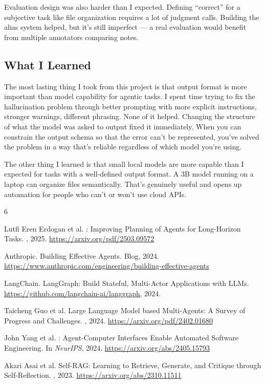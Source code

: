 \documentclass{article}
\begin{document}
Evaluation design was also harder than I expected. Defining ``correct'' for a subjective task like file organization requires a lot of judgment calls. Building the alias system helped, but it's still imperfect — a real evaluation would benefit from multiple annotators comparing notes.

\subsection{What I Learned}

The most lasting thing I took from this project is that output format is more important than model capability for agentic tasks. I spent time trying to fix the hallucination problem through better prompting with more explicit instructions, stronger warnings, different phrasing. None of it helped. Changing the structure of what the model was asked to output fixed it immediately. When you can constrain the output schema so that the error can't be represented, you've solved the problem in a way that's reliable regardless of which model you're using.

The other thing I learned is that small local models are more capable than I expected for tasks with a well-defined output format. A 3B model running on a laptop can organize files semantically. That's genuinely useful and opens up automation for people who can't or won't use cloud APIs.



\begin{thebibliography}{6}

Lutfi Eren Erdogan et al.
: Improving Planning of Agents for Long-Horizon Tasks.
, 2025.
\newblock \url{https://arxiv.org/pdf/2503.09572}

Anthropic.
\newblock Building Effective Agents.
\newblock Blog, 2024.
\newblock \url{https://www.anthropic.com/engineering/building-effective-agents}

LangChain.
\newblock LangGraph: Build Stateful, Multi-Actor Applications with LLMs.
\newblock \url{https://github.com/langchain-ai/langgraph}, 2024.

Taicheng Guo et al.
\newblock Large Language Model based Multi-Agents: A Survey of Progress and Challenges.
, 2024.
\newblock \url{https://arxiv.org/pdf/2402.01680}

John Yang et al.
: Agent-Computer Interfaces Enable Automated Software Engineering.
\newblock In {\em NeurIPS}, 2024.
\newblock \url{https://arxiv.org/abs/2405.15793}

Akari Asai et al.
\newblock Self-{RAG}: Learning to Retrieve, Generate, and Critique through Self-Reflection.
, 2023.
\newblock \url{https://arxiv.org/abs/2310.11511}

\end{thebibliography}
\end{document}
